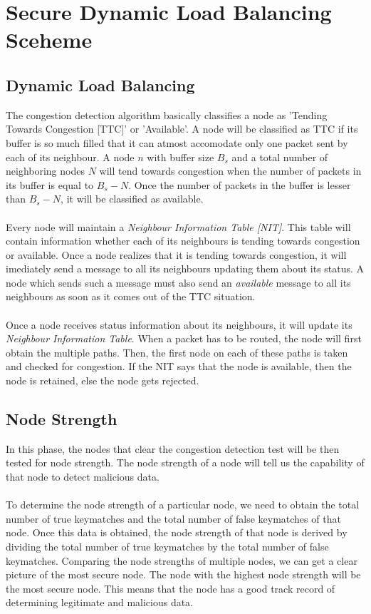 \documentclass[journal]{IEEEtran}
\begin{document}
\section{Secure Dynamic Load Balancing Sceheme}
\subsection{Dynamic Load Balancing}
The congestion detection algorithm basically classifies a node as 'Tending Towards Congestion [TTC]' or 'Available'. A node will be classified as TTC if its buffer is so much filled that it can atmost accomodate only one packet sent by each of its neighbour. A node $n$ with buffer size $B_s$ and a total number of neighboring nodes $N$ will tend towards congestion when the number of packets in its buffer is equal to $B_s - N$. Once the number of packets in the buffer is lesser than $B_s - N$, it will be classified as available.\\ \\
\indent Every node will maintain a \textit{Neighbour Information Table [NIT]}. This table will contain information whether each of its neighbours is tending towards congestion or available. Once a node realizes that it is tending towards congestion, it will imediately send a message to all its neighbours updating them about its status. A node which sends such a message must also send an \textit{available} message to all its neighbours as soon as it comes out of the TTC situation.\\ \\
\indent Once a node receives status information about its neighbours, it will update its \textit{Neighbour Information Table}. When a packet has to be routed, the node will first obtain the multiple paths. Then, the first node on each of these paths is taken and checked for congestion. If the NIT says that the node is available, then the node is retained, else the node gets rejected. 

\subsection{Node Strength}
In this phase, the nodes that clear the congestion detection test will be then tested for node strength. The node strength of a node will tell us the capability of that node to detect malicious data.\\ \\
\indent To determine the node strength of a particular  node, we need to obtain the total number of true keymatches and the total number of false keymatches of that node. Once this data is obtained, the node strength of that node is derived by dividing the total number of true keymatches by the total number of false keymatches. Comparing the node strengths of multiple nodes, we can get a clear picture of the most secure node. The node with the highest node strength will be the most secure node. This means that the node has a good track record of determining legitimate and malicious data.
\end{document}
